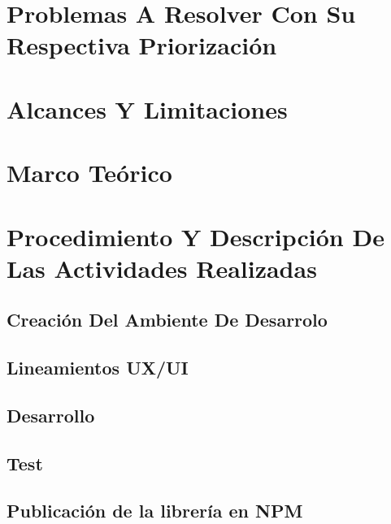 \documentclass[a4paper,12pt, listof=totoc]{report}
\begin{document}
		\chapter {Problemas A Resolver Con Su Respectiva Priorización }
			
			
		\chapter {Alcances Y Limitaciones }
				
		
		\chapter {Marco Teórico  }
			
		
		\chapter {Procedimiento Y Descripción De Las Actividades Realizadas}
			
			
			\section {Creación Del Ambiente De Desarrolo}
				
				
			\section {Lineamientos UX/UI}
				
				
			\section {Desarrollo}
				
				
			\section {Test }
				
				
			\section {Publicación de la librería en NPM }
				
			
\end{document}
